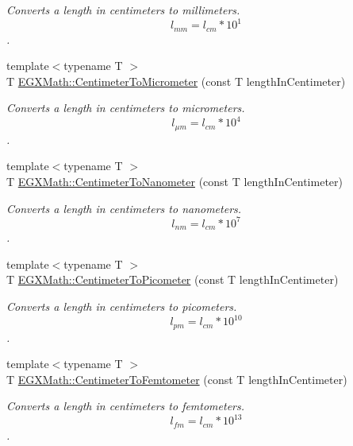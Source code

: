 \begin{DoxyCompactItemize}
\begin{DoxyCompactList}\small\item\em Converts a length in centimeters to millimeters. \[ l_{mm}=l_{cm} * 10^{1} \]. \end{DoxyCompactList}\item 
{\footnotesize template$<$typename T $>$ }\\T \mbox{\hyperlink{group___e_g_x_math-_conversions-_length_conversions-_s_i-_centimeter-_s_i_gaa05fd2c1b2c9ab2ac8aa7f1ef8be612a}{E\+G\+X\+Math\+::\+Centimeter\+To\+Micrometer}} (const T length\+In\+Centimeter)
\begin{DoxyCompactList}\small\item\em Converts a length in centimeters to micrometers. \[ l_{\mu m}=l_{cm} * 10^{4} \]. \end{DoxyCompactList}\item 
{\footnotesize template$<$typename T $>$ }\\T \mbox{\hyperlink{group___e_g_x_math-_conversions-_length_conversions-_s_i-_centimeter-_s_i_gacf80778df778af3266027dbe32bfd2d4}{E\+G\+X\+Math\+::\+Centimeter\+To\+Nanometer}} (const T length\+In\+Centimeter)
\begin{DoxyCompactList}\small\item\em Converts a length in centimeters to nanometers. \[ l_{nm}=l_{cm} * 10^{7} \]. \end{DoxyCompactList}\item 
{\footnotesize template$<$typename T $>$ }\\T \mbox{\hyperlink{group___e_g_x_math-_conversions-_length_conversions-_s_i-_centimeter-_s_i_ga7e2851b0052f1b135a84aa860495e4ba}{E\+G\+X\+Math\+::\+Centimeter\+To\+Picometer}} (const T length\+In\+Centimeter)
\begin{DoxyCompactList}\small\item\em Converts a length in centimeters to picometers. \[ l_{pm}=l_{cm} * 10^{10} \]. \end{DoxyCompactList}\item 
{\footnotesize template$<$typename T $>$ }\\T \mbox{\hyperlink{group___e_g_x_math-_conversions-_length_conversions-_s_i-_centimeter-_s_i_ga1d86301dcf9e8d9d75127c3d998f9c0b}{E\+G\+X\+Math\+::\+Centimeter\+To\+Femtometer}} (const T length\+In\+Centimeter)
\begin{DoxyCompactList}\small\item\em Converts a length in centimeters to femtometers. \[ l_{fm}=l_{cm} * 10^{13} \]. \end{DoxyCompactList}\item 

\end{DoxyCompactItemize}
